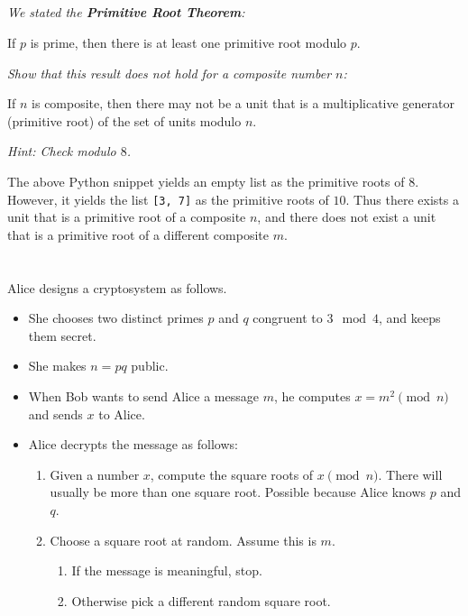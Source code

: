 \documentclass[12pt]{article}
\begin{document}
    \subsection{} \textit{We stated the \textbf{Primitive Root Theorem}:}

        \begin{thm}
            If $p$ is prime, then there is at least one primitive root modulo $p$.
        \end{thm}

        \textit{Show that this result does not hold for a composite number $n$:}

        \begin{thm}
            If $n$ is composite, then there may not be a unit that is a multiplicative generator (primitive root) of the set of units modulo $n$.
        \end{thm}

        \textit{Hint: Check modulo $8$.}

        The above Python snippet yields an empty list as the primitive roots of $8$. However, it yields the list \texttt{[3, 7]} as the primitive roots of $10$. Thus there exists a unit that is a primitive root of a composite $n$, and there does not exist a unit that is a primitive root of a different composite $m$.

\section{} Alice designs a cryptosystem as follows.
    \begin{itemize}
        \item She chooses two distinct primes $p$ and $q$ congruent to $3 \mod 4$, and keeps them secret.
        \item She makes $n = pq$ public.
        \item When Bob wants to send Alice a message $m$, he computes $x = m^2 \pmod{n}$ and sends $x$ to Alice.
        \item Alice decrypts the message as follows:
        \begin{enumerate}
            \item Given a number $x$, compute the square roots of $x \pmod{n}$. There will usually be more than one square root. Possible because Alice knows $p$ and $q$.
            \item Choose a square root at random. Assume this is $m$.
            \begin{enumerate}
                \item If the message is meaningful, stop.
                \item Otherwise pick a different random square root.
            \end{enumerate}
        \end{enumerate}
    \end{itemize}
\end{document}
